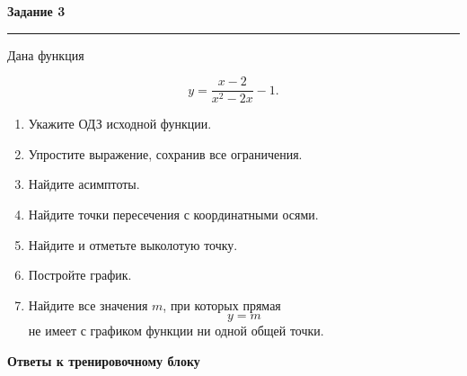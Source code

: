 \documentclass[a4paper,12pt]{article}
\newcommand{\sectiontitle}[1]{%
    \par\vspace{0.65em}
    {\Large\bfseries\color{darkaccent}#1}\par
    \vspace{0.15em}
    {\color{accent}\rule{\linewidth}{0.65pt}}\par
    \vspace{0.3em}
}
\begin{document}
\sectiontitle{Задание 3}

Дана функция

\[
\boxed{y=\frac{x-2}{x^2-2x}-1}.
\]

\begin{enumerate}[label=\alph*)]
    \item Укажите ОДЗ исходной функции.
    \item Упростите выражение, сохранив все ограничения.
    \item Найдите асимптоты.
    \item Найдите точки пересечения с координатными осями.
    \item Найдите и отметьте выколотую точку.
    \item Постройте график.
    \item Найдите все значения \(m\), при которых прямая
    \[
    y=m
    \]
    не имеет с графиком функции ни одной общей точки.
\end{enumerate}

\clearpage

\begin{center}
{\LARGE\bfseries\color{darkaccent}
Ответы к тренировочному блоку}
\end{center}

\vspace{0.55cm}

\renewcommand{\arraystretch}{1.4}
\end{document}
